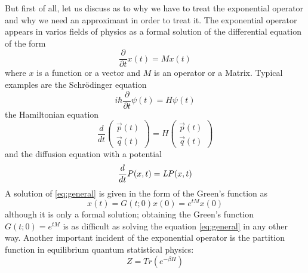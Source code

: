 But first of all, let us discuss as to why we have to treat the exponential operator and why we need an approximant in order to treat it. The exponential operator appears in varios fields of physics as a formal solution of the differential equation of the form
\begin{equation} \label{eq:general}
\dfrac{\partial}{\partial t} x(t) = M x(t)
\end{equation}
where $x$ is a function or a vector and $M$ is an operator or a Matrix. Typical examples are the Schr\"odinger equation
\begin{equation}
i\hbar\dfrac{\partial}{\partial t} \psi(t) = H\psi(t)
\end{equation}
the Hamiltonian equation
\begin{equation}
\dfrac{d}{d t} 
\begin{pmatrix}
\vec{p}(t) \\ \vec{q}(t)
\end{pmatrix}
= H
\begin{pmatrix}
\vec{p}(t) \\ \vec{q}(t)
\end{pmatrix}
\end{equation}
and the diffusion equation with a potential
\begin{equation}
\dfrac{d}{dt}P(x,t) = \emph{L} P(x,t)
\end{equation}
A solution of \eqref{eq:general} is given in the form of the Green's function as 
\begin{equation}
x(t) = G(t;0)x(0) = e^{tM}x(0)
\end{equation}
although it is only a formal solution; obtaining the Green's function $G(t;0) = e^{tM}$ is as difficult as solving the equation \eqref{eq:general} in any other way. Another important incident of the exponential operator is the partition function in equilibrium quantum statistical physics:
\begin{equation}
Z = Tr(e^{- \beta H})
\end{equation}

